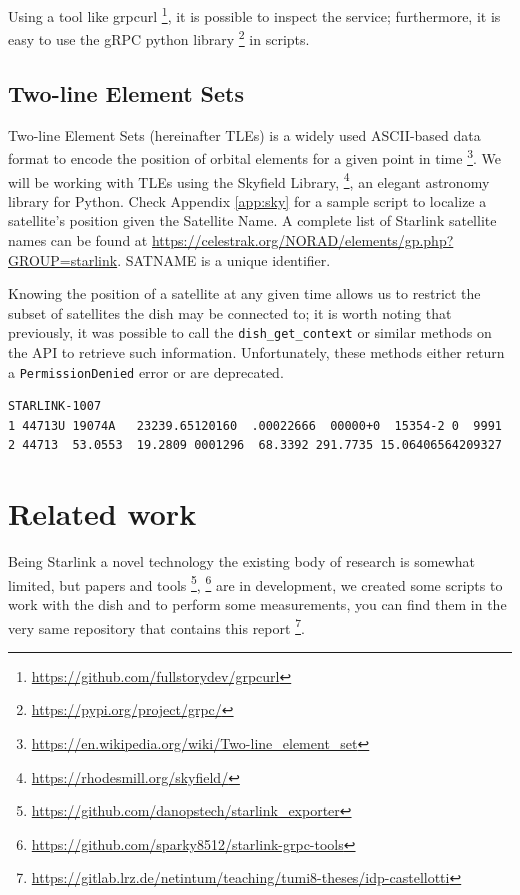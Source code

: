 \documentclass[IN,11pt,twoside,openright,idp,english]{tumthesis}
\begin{document}
Using a tool like grpcurl \footnote{\url{https://github.com/fullstorydev/grpcurl}}, it is possible to inspect the service; furthermore, it is easy to use the gRPC python library \footnote{\url{https://pypi.org/project/grpc/}} in scripts.
    
\subsection{Two-line Element Sets}
    
Two-line Element Sets (hereinafter TLEs) is a widely used ASCII-based data format to encode the position of orbital elements for a given point in time \footnote{\url{https://en.wikipedia.org/wiki/Two-line_element_set}}. We will be working with TLEs using the Skyfield Library, \footnote{\url{https://rhodesmill.org/skyfield/}}, an elegant astronomy library for Python. Check Appendix \ref{app:sky} for a sample script to localize a satellite's position given the Satellite Name. A complete list of Starlink satellite names can be found at \url{https://celestrak.org/NORAD/elements/gp.php?GROUP=starlink}. 
SATNAME is a unique identifier.
    
Knowing the position of a satellite at any given time allows us to restrict the subset of satellites the dish may be connected to; it is worth noting that previously, it was possible to call the \texttt{dish\_get\_context} or similar methods on the API to retrieve such information. Unfortunately, these methods either return a \texttt{PermissionDenied} error or are deprecated.
    
\begin{lstlisting}[caption={TLE for satellite STARLINK-1007 },captionpos=b]
STARLINK-1007           
1 44713U 19074A   23239.65120160  .00022666  00000+0  15354-2 0  9991
2 44713  53.0553  19.2809 0001296  68.3392 291.7735 15.06406564209327
\end{lstlisting}
    
\section{Related work}
    
Being Starlink a novel technology the existing body of research is somewhat limited, but papers and tools \footnote{\url{https://github.com/danopstech/starlink\_exporter}}, \footnote{\url{https://github.com/sparky8512/starlink-grpc-tools}} are in development, we created some scripts to work with the dish and to perform some measurements, you can find them in the very same repository that contains this report \footnote{\url{https://gitlab.lrz.de/netintum/teaching/tumi8-theses/idp-castellotti}}.
    
\end{document}

